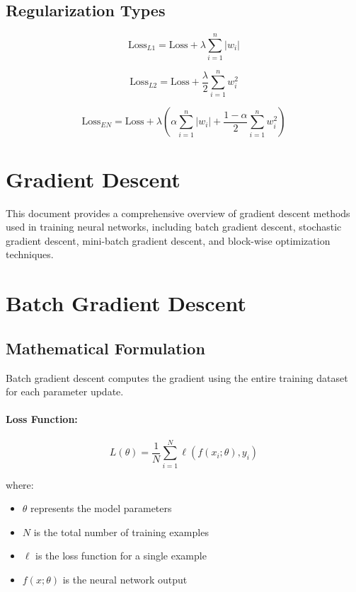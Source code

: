 \documentclass{tufte-handout}
\begin{document}
\subsection{Regularization Types}

\[
\text{Loss}_{L1} = \text{Loss} + \lambda \sum_{i=1}^n |w_i|
\]

\[
\text{Loss}_{L2} = \text{Loss} + \frac{\lambda}{2} \sum_{i=1}^n w_i^2
\]

\[
\text{Loss}_{EN} = \text{Loss} + \lambda \left( \alpha \sum_{i=1}^n |w_i| + \frac{1-\alpha}{2} \sum_{i=1}^n w_i^2 \right)
\]


\section{Gradient Descent}

This document provides a comprehensive overview of gradient descent methods used in training neural networks, including batch gradient descent, stochastic gradient descent, mini-batch gradient descent, and block-wise optimization techniques.

\section{Batch Gradient Descent}

\subsection{Mathematical Formulation}

Batch gradient descent computes the gradient using the entire training dataset for each parameter update.

\paragraph{Loss Function:}
\begin{equation}
L(\theta) = \frac{1}{N} \sum_{i=1}^{N} \ell(f(x_i; \theta), y_i)
\end{equation}

where:
\begin{itemize}
    \item $\theta$ represents the model parameters
    \item $N$ is the total number of training examples
    \item $\ell$ is the loss function for a single example
    \item $f(x; \theta)$ is the neural network output
\end{itemize}
\end{document}

